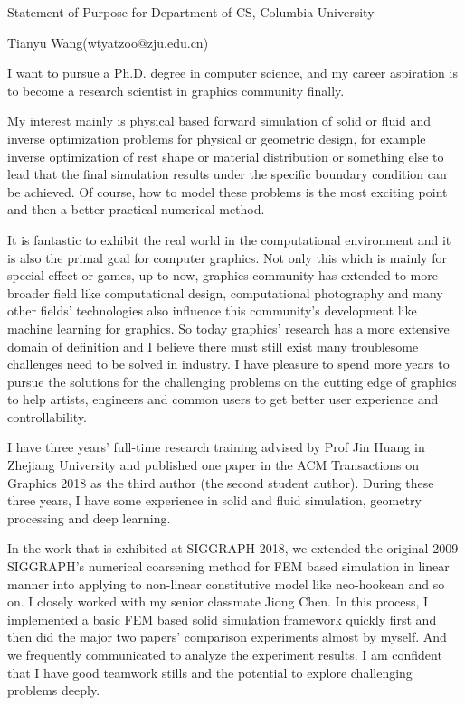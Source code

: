 \documentclass[a4paper,12pt]{article}
\begin{document}
\centerline{\large{Statement of Purpose for Department of CS, Columbia University}}
\vspace{2ex}
\centerline{\large{Tianyu Wang(wtyatzoo@zju.edu.cn)}}
\vspace{2ex}

I want to pursue a Ph.D. degree in computer science, and my career aspiration is to become a research scientist in graphics community finally.\vspace{1.2ex}

My interest mainly is physical based forward simulation of solid or fluid and inverse optimization problems for physical or geometric design, for example inverse optimization of rest shape or material distribution or something else to lead that the final simulation results under the specific boundary condition can be achieved. Of course, how to model these problems is the most exciting point and then a better practical numerical method.\vspace{1.2ex}

It is fantastic to exhibit the real world in the computational environment and it is also the primal goal for computer graphics. Not only this which is mainly for special effect or games, up to now, graphics community has extended to more broader field like computational design, computational photography and many other fields' technologies also influence this community's development like machine learning for graphics. So today graphics' research has a more extensive domain of definition and I believe there must still exist many troublesome challenges need to be solved in industry. I have pleasure to spend more years to pursue the solutions for the challenging problems on the cutting edge of graphics to help artists, engineers and common users to get better user experience and controllability. \vspace{1.2ex} 

I have three years' full-time research training advised by Prof Jin Huang in Zhejiang University and published one paper in the ACM Transactions on Graphics 2018 as the third author (the second student author). During these three years, I have some experience in solid and fluid simulation, geometry processing and deep learning.\vspace{1.2ex} 

In the work that is exhibited at SIGGRAPH 2018, we extended the original 2009 SIGGRAPH's numerical coarsening method for FEM based simulation in linear manner into applying to non-linear constitutive model like neo-hookean and so on. I closely worked with my senior classmate Jiong Chen. In this process, I implemented a basic FEM based solid simulation framework quickly first and then did the major two papers' comparison experiments almost by myself. And we frequently communicated to analyze the experiment results. I am confident that I have good teamwork stills and the potential to explore challenging problems deeply.\vspace{1.2ex}
\end{document}
